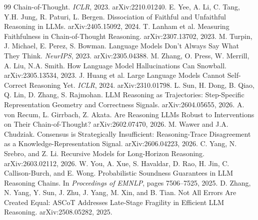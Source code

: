 \documentclass{article}
\begin{document}
\begin{thebibliography}{99}
Chain-of-Thought. \emph{ICLR}, 2023. arXiv:2210.01240.
 E. Yee, A. Li, C. Tang, Y.H. Jung,
R. Paturi, L. Bergen.
\newblock Dissociation of Faithful and Unfaithful Reasoning in LLMs.
\newblock arXiv:2405.15092, 2024.
 T. Lanham et al.
\newblock Measuring Faithfulness in Chain-of-Thought Reasoning.
\newblock arXiv:2307.13702, 2023.
 M. Turpin, J. Michael,
E. Perez, S. Bowman.
\newblock Language Models Don't Always Say What They Think.
\newblock \emph{NeurIPS}, 2023. arXiv:2305.04388.
 M. Zhang, O. Press, W. Merrill,
A. Liu, N.A. Smith.
\newblock How Language Model Hallucinations Can Snowball.
\newblock arXiv:2305.13534, 2023.
 J. Huang et al.
\newblock Large Language Models Cannot Self-Correct Reasoning Yet.
\newblock \emph{ICLR}, 2024. arXiv:2310.01798.
 L. Sun, H. Dong, B. Qiao, Q. Lin,
D. Zhang, S. Rajmohan.
\newblock LLM Reasoning as Trajectories: Step-Specific Representation Geometry and
Correctness Signals.
\newblock arXiv:2604.05655, 2026.
 A. von Recum, L. Girrbach,
Z. Akata.
\newblock Are Reasoning LLMs Robust to Interventions on Their Chain-of-Thought?
\newblock arXiv:2602.07470, 2026.
M. Wawer and J.A. Chudziak.
\newblock Consensus is Strategically Insufficient: Reasoning-Trace Disagreement
as a Knowledge-Representation Signal.
\newblock arXiv:2606.04223, 2026.
C. Yang, N. Srebro, and Z. Li.
\newblock Recursive Models for Long-Horizon Reasoning.
\newblock arXiv:2603.02112, 2026.
W. You, A. Xue, S. Havaldar, D. Rao, H. Jin, C. Callison-Burch, and E. Wong.
\newblock Probabilistic Soundness Guarantees in LLM Reasoning Chains.
\newblock In \emph{Proceedings of EMNLP}, pages 7506--7525, 2025.
D. Zhang, N. Yang, Y. Sun, J. Zhu, J. Yang, M. Xin, and B. Tian.
\newblock Not All Errors Are Created Equal: ASCoT Addresses Late-Stage Fragility
in Efficient LLM Reasoning.
\newblock arXiv:2508.05282, 2025.
\end{thebibliography}
\end{document}
